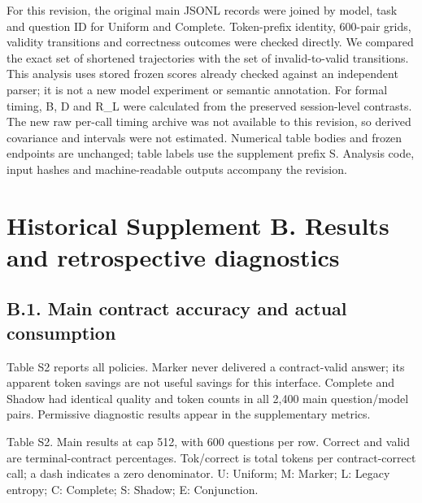 \documentclass[
  12pt,
  a4paper,
]{article}
\begin{document}
For this revision, the original main JSONL records were joined by model,
task and question ID for Uniform and Complete. Token-prefix identity,
600-pair grids, validity transitions and correctness outcomes were
checked directly. We compared the exact set of shortened trajectories
with the set of invalid-to-valid transitions. This analysis uses stored
frozen scores already checked against an independent parser; it is not a
new model experiment or semantic annotation. For formal timing, B, D and
R\_L were calculated from the preserved session-level contrasts. The new
raw per-call timing archive was not available to this revision, so
derived covariance and intervals were not estimated. Numerical table
bodies and frozen endpoints are unchanged; table labels use the
supplement prefix S. Analysis code, input hashes and machine-readable
outputs accompany the revision.

\section{Historical Supplement B. Results and retrospective
diagnostics}\label{historical-supplement-b.-results-and-retrospective-diagnostics}

\subsection{B.1. Main contract accuracy and actual
consumption}\label{b.1.-main-contract-accuracy-and-actual-consumption}

Table S2 reports all policies. Marker never delivered a contract-valid
answer; its apparent token savings are not useful savings for this
interface. Complete and Shadow had identical quality and token counts in
all 2,400 main question/model pairs. Permissive diagnostic results
appear in the supplementary metrics.

Table S2. Main results at cap 512, with 600 questions per row. Correct
and valid are terminal-contract percentages. Tok/correct is total tokens
per contract-correct call; a dash indicates a zero denominator. U:
Uniform; M: Marker; L: Legacy entropy; C: Complete; S: Shadow; E:
Conjunction.
\end{document}

